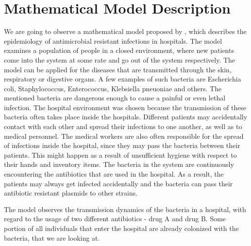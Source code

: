 \chapter*{Mathematical Model Description}


We are going to observe a mathematical model proposed by \cite{lips}, which describes the epidemiology of antimicrobial resistant infections in hospitals. The model examines a population of people in a closed environment, where new patients come into the system at some rate and go out of the system respectively. The model can be applied for the diseases that are transmitted through the skin, respiratory or digestive organs. A few examples of such bacteria are Escherichia coli, Staphylococcus, Enterococcus, Klebsiella pneuoniae and others. The mentioned bacteria are dangerous enough to cause a painful or even lethal infection. The hospital environment was chosen because the transmission of these bacteria often takes place inside the hospitals. Different patients may accidentally contact with each other and spread their infections to one another, as well as to medical personnel. The medical workers are also often responsible for the spread of infections inside the hospital, since they may pass the bacteria between their patients. This might happen as a result of unsufficient hygiene with respect to their hands and inventory items. The bacteria in the system are continuously encountering the antibiotics that are used in the hospital. As a result, the patients may always get infected accidentally and the bacteria can pass their antibiotic resistant plasmids to other strains.

The model observes the transmission dynamics of the bacteria in a hospital, with regard to the usage of two different antibiotics - drug A and drug B. Some portion of all individuals that enter the hospital are already colonized with the bacteria, that we are looking at.
